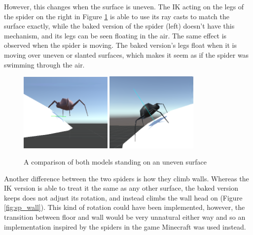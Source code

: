 However, this changes when the surface is uneven. The IK acting on
the legs of the spider on the right in Figure \ref{fig:sp_round} is able to use
its ray casts to match the surface exactly, while the baked version of the
spider (left) doesn't have this mechanism, and its legs can be seen floating in
the air. The same effect is observed when the spider is moving. The baked
version's legs float when it is moving over uneven or slanted surfaces, which
makes it seem as if the spider was swimming through the air. 

\begin{figure}[h!]
    \centering
    \captionsetup{justification=centering}
    \includegraphics[width=0.4\textwidth]{grafika/sp_b_round.png}
    \includegraphics[width=0.4\textwidth]{grafika/sp_ik_round.png}
    \caption{A comparison of both models standing on an uneven surface}
    \label{fig:sp_round}
\end{figure}

Another difference between the two spiders is how they climb walls. Whereas the
IK version is able to treat it the same as any other surface, the baked version
keeps does not adjust its rotation, and instead climbs the wall head on (Figure
\ref{fig:sp_wall}). This kind of rotation could have been implemented, however,
the transition between floor and wall would be very unnatural either way and so
an implementation inspired by the spiders in the game Minecraft was used
instead.

